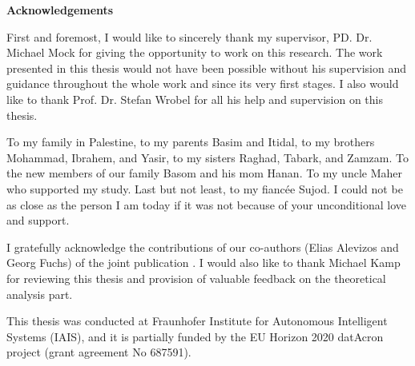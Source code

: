 

	\thispagestyle{empty}
{\noindent%
	\huge{\textbf{\textsf{Acknowledgements}}}
}
\vspace{2cm}
\begin{flushleft}
	\noindent%

\justify
\par First and foremost, I would like to sincerely thank my supervisor, PD. Dr. Michael Mock for giving the opportunity to work on this research. The work presented in this thesis would not have been possible without his supervision and guidance throughout the whole work and since its very first stages. I also would like to thank Prof. Dr. Stefan Wrobel for all his help and supervision on this thesis. 

\justify
\par To my family in Palestine, to my parents Basim and Itidal, to my brothers Mohammad, Ibrahem, and Yasir, to my sisters Raghad, Tabark, and Zamzam. To the new members of our family Basom and his mom Hanan. To my uncle Maher who supported my study. Last but not least, to my fiancée Sujod. I could not be as close as the person I am today if it was not because of your unconditional love and support. 

\justify
\par I gratefully acknowledge the contributions of our co-authors (Elias Alevizos and Georg Fuchs) of the joint publication \cite{Qadah}. I would also like to thank  Michael Kamp for reviewing this thesis and provision of valuable feedback on the theoretical analysis part.
\justify
\par This thesis was conducted at Fraunhofer Institute for Autonomous Intelligent Systems (IAIS), and it is partially funded by the EU Horizon 2020 datAcron project (grant agreement No 687591).

	
	
\end{flushleft}

